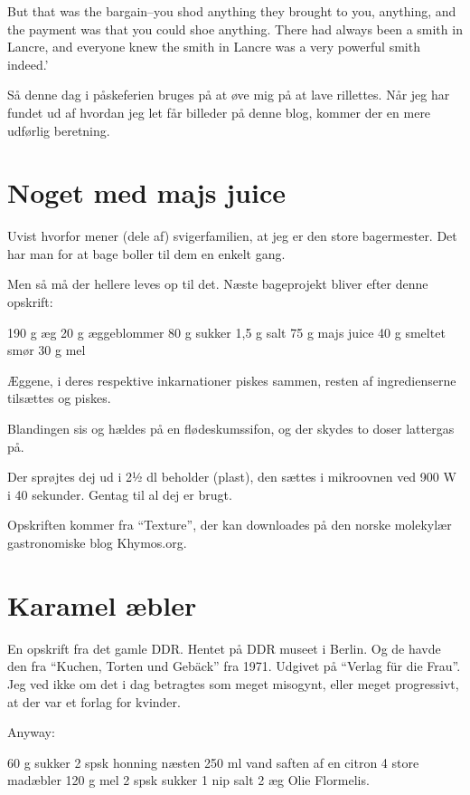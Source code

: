 \documentclass[
  letterpaper,
  DIV=11,
  numbers=noendperiod]{scrreprt}
\begin{document}
But that was the bargain--you shod anything they brought to you,
anything, and the payment was that you could shoe anything. There had
always been a smith in Lancre, and everyone knew the smith in Lancre was
a very powerful smith indeed.'

Så denne dag i påskeferien bruges på at øve mig på at lave rillettes.
Når jeg har fundet ud af hvordan jeg let får billeder på denne blog,
kommer der en mere udførlig beretning.

\hypertarget{noget-med-majs-juice}{%
\section{Noget med majs juice}\label{noget-med-majs-juice}}

Uvist hvorfor mener (dele af) svigerfamilien, at jeg er den store
bagermester. Det har man for at bage boller til dem en enkelt gang.

Men så må der hellere leves op til det. Næste bageprojekt bliver efter
denne opskrift:

190 g æg 20 g æggeblommer 80 g sukker 1,5 g salt 75 g majs juice 40 g
smeltet smør 30 g mel

Æggene, i deres respektive inkarnationer piskes sammen, resten af
ingredienserne tilsættes og piskes.

Blandingen sis og hældes på en flødeskumssifon, og der skydes to doser
lattergas på.

Der sprøjtes dej ud i 2½ dl beholder (plast), den sættes i mikroovnen
ved 900 W i 40 sekunder. Gentag til al dej er brugt.

Opskriften kommer fra ``Texture'', der kan downloades på den norske
molekylær gastronomiske blog Khymos.org.

\hypertarget{karamel-uxe6bler}{%
\section{Karamel æbler}\label{karamel-uxe6bler}}

En opskrift fra det gamle DDR. Hentet på DDR museet i Berlin. Og de
havde den fra ``Kuchen, Torten und Gebäck'' fra 1971. Udgivet på
``Verlag für die Frau''. Jeg ved ikke om det i dag betragtes som meget
misogynt, eller meget progressivt, at der var et forlag for kvinder.

Anyway:

60 g sukker 2 spsk honning næsten 250 ml vand saften af en citron 4
store madæbler 120 g mel 2 spsk sukker 1 nip salt 2 æg Olie Flormelis.
\end{document}
